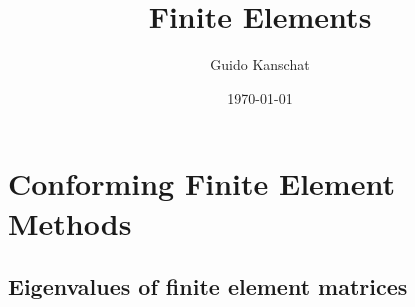 \usetikzlibrary{svg.path}


\def\constref#1{C_{\text{\ref{#1}}}}
\title{Finite Elements}
\author{Guido Kanschat}
\date{\today}

\def\vecx{\mathbf x}

\maketitle
\tableofcontents
%

%


%

% 

\setcounter{chapter}{3}
\chapter{Conforming Finite Element Methods}
\setcounter{section}{2}


\section{Eigenvalues of finite element matrices}

